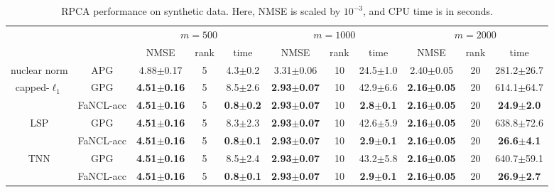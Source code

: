 \documentclass[10pt,journal,compsoc]{IEEEtran}
\begin{document}
\begin{table*}[ht]
\centering
\caption{RPCA performance on synthetic data. 
	Here, NMSE is scaled by $10^{-3}$, and  CPU time is in seconds.}
\vspace{-10px}

\begin{tabular}{cc|ccc|ccc|ccc}
	\hline
	&                    &             \multicolumn{3}{c|}{$m=500$}             &            \multicolumn{3}{c|}{$m=1000$}             &             \multicolumn{3}{c}{$m=2000$}              \\
	&                    &          NMSE          & rank &         time         &          NMSE          & rank &         time         &          NMSE          & rank &         time          \\ \hline
	nuclear norm   &    \textsf{APG}    &     4.88$\pm$0.17      &  5   &     4.3$\pm$0.2      &     3.31$\pm$0.06      &  10  &     24.5$\pm$1.0     &     2.40$\pm$0.05      &  20  &    281.2$\pm$26.7     \\ \hline\hline
	capped-$\ell_1$ &    \textsf{GPG}    & \textbf{4.51$\pm$0.16} &  5   &     8.5$\pm$2.6      & \textbf{2.93$\pm$0.07} &  10  &     42.9$\pm$6.6     & \textbf{2.16$\pm$0.05} &  20  &    614.1$\pm$64.7     \\ \cline{2-11}
	& \textsf{FaNCL-acc} & \textbf{4.51$\pm$0.16} &  5   & \textbf{0.8$\pm$0.2} & \textbf{2.93$\pm$0.07} &  10  & \textbf{2.8$\pm$0.1} & \textbf{2.16$\pm$0.05} &  20  & \textbf{24.9$\pm$2.0} \\ \hline
	LSP       &    \textsf{GPG}    & \textbf{4.51$\pm$0.16} &  5   &     8.3$\pm$2.3      & \textbf{2.93$\pm$0.07} &  10  &     42.6$\pm$5.9     & \textbf{2.16$\pm$0.05} &  20  &    638.8$\pm$72.6     \\ \cline{2-11}
	& \textsf{FaNCL-acc} & \textbf{4.51$\pm$0.16} &  5   & \textbf{0.8$\pm$0.1} & \textbf{2.93$\pm$0.07} &  10  & \textbf{2.9$\pm$0.1} & \textbf{2.16$\pm$0.05} &  20  & \textbf{26.6$\pm$4.1} \\ \hline
	TNN       &    \textsf{GPG}    & \textbf{4.51$\pm$0.16} &  5   &     8.5$\pm$2.4      & \textbf{2.93$\pm$0.07} &  10  &     43.2$\pm$5.8     & \textbf{2.16$\pm$0.05} &  20  &    640.7$\pm$59.1     \\ \cline{2-11}
	& \textsf{FaNCL-acc} & \textbf{4.51$\pm$0.16} &  5   & \textbf{0.8$\pm$0.1} & \textbf{2.93$\pm$0.07} &  10  & \textbf{2.9$\pm$0.1} & \textbf{2.16$\pm$0.05} &  20  & \textbf{26.9$\pm$2.7} \\ \hline
\end{tabular}
\label{tab:synperformance}
\end{table*}
\end{document}
